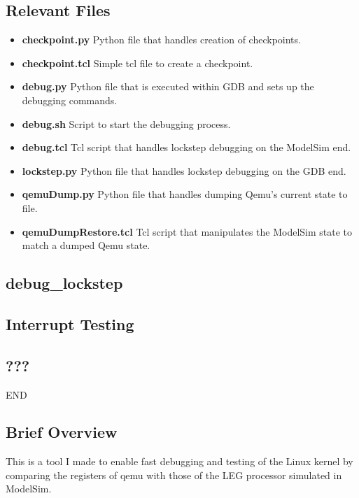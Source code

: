 
\subsection{Relevant Files}

\begin{itemize}
\item \textbf{checkpoint.py} Python file that handles creation of checkpoints.
\item \textbf{checkpoint.tcl} Simple tcl file to create a checkpoint.
\item \textbf{debug.py} Python file that is executed within GDB and sets up the debugging commands.
\item \textbf{debug.sh} Script to start the debugging process.
\item \textbf{debug.tcl} Tcl script that handles lockstep debugging on the ModelSim end.
\item \textbf{lockstep.py} Python file that handles lockstep debugging on the GDB end.
\item \textbf{qemuDump.py} Python file that handles dumping Qemu's current state to file.
\item \textbf{qemuDumpRestore.tcl} Tcl script that manipulates the ModelSim state to match a dumped Qemu state.
\end{itemize}

\subsection{debug\_lockstep}

\subsection{Interrupt Testing}

\subsection{???}

END


\subsection{Brief Overview}

This is a tool I made to enable fast debugging and testing of the Linux kernel by comparing the registers of qemu with those of the LEG processor simulated in ModelSim.






